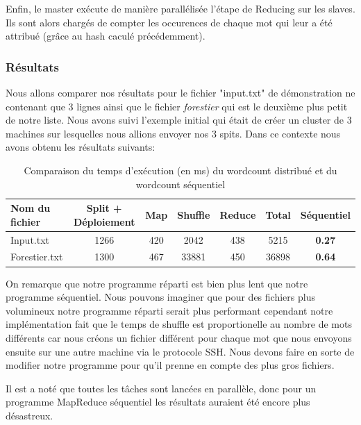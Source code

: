 \documentclass{article}
\begin{document}
Enfin, le master exécute de manière parallélisée l'étape de Reducing sur les slaves. Ils sont alors chargés de compter les occurences de chaque mot qui leur a été attribué (grâce au hash caculé précédemment).


\subsubsection{Résultats}

Nous allons comparer nos résultats pour le fichier "input.txt" de démonstration ne contenant que 3 lignes ainsi que le fichier \textit{forestier} qui est le deuxième plus petit de notre liste. Nous avons suivi l'exemple initial qui était de créer un cluster
de 3 machines sur lesquelles nous allions envoyer nos 3 spits. Dans ce contexte nous avons obtenu les résultats suivants:
\begin{table}[h!]
    \begin{center}
        \begin{tabular}{| l || c | c | c | c | c || c |}
            \hline			
              \textbf{Nom du fichier} & \textbf{Split + Déploiement} & \textbf{Map} & \textbf{Shuffle} & \textbf{Reduce} & \textbf{Total} & \textbf{Séquentiel}\\ \hline
              Input.txt & 1266 & 420 & 2042 & 438 & 5215 & \textbf{0.27}\\ \hline 
              Forestier.txt & 1300 & 467 & 33881 & 450 & 36898 & \textbf{0.64}\\ \hline
        \end{tabular}
    \end{center}
    \caption{Comparaison du temps d'exécution (en ms) du wordcount distribué et du wordcount séquentiel}
\end{table}

On remarque que notre programme réparti est bien plus lent que notre programme séquentiel. Nous pouvons imaginer que pour des fichiers plus volumineux notre programme réparti serait plus performant 
cependant notre implémentation fait que le temps de shuffle est proportionelle au nombre de mots différents car nous créons un fichier différent pour chaque mot que nous envoyons ensuite sur une autre machine
via le protocole SSH. Nous devons faire en sorte de modifier notre programme pour qu'il prenne en compte des plus gros fichiers.

Il est a noté que toutes les tâches sont lancées en parallèle, donc pour un programme MapReduce séquentiel les résultats auraient été encore plus désastreux.
\end{document}
